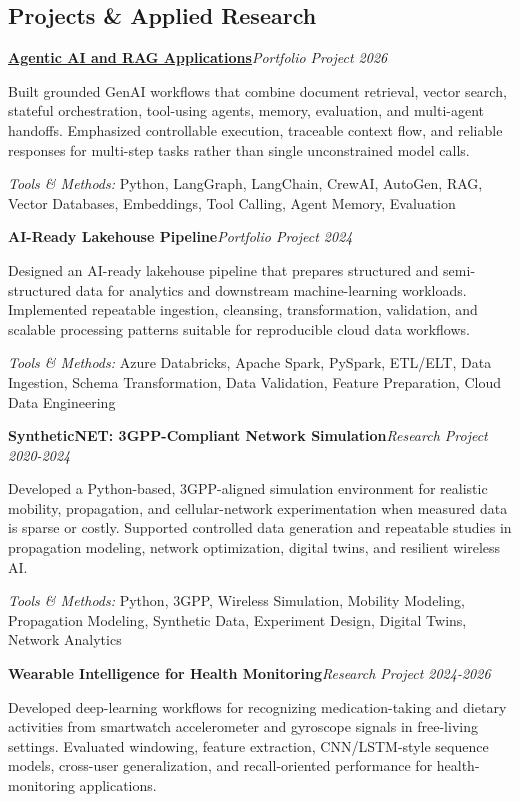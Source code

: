 \documentclass[9pt,letterpaper]{extarticle}
\newcommand{\entry}[2]{\Needspace{4\baselineskip}\textbf{#1}\hfill\textit{#2}\par}
\begin{document}
\subsection{Projects \& Applied Research}
\entry{\href{https://github.com/WaseemRaza844/agentic-ai-projects-by-was}{Agentic AI and RAG Applications}}{Portfolio Project \textbar{} 2026}
Built grounded GenAI workflows that combine document retrieval, vector search, stateful orchestration, tool-using agents, memory, evaluation, and multi-agent handoffs. Emphasized controllable execution, traceable context flow, and reliable responses for multi-step tasks rather than single unconstrained model calls.\par
{\small\textit{Tools \& Methods:} Python, LangGraph, LangChain, CrewAI, AutoGen, RAG, Vector Databases, Embeddings, Tool Calling, Agent Memory, Evaluation\par}
\vspace{1pt}
\entry{AI-Ready Lakehouse Pipeline}{Portfolio Project \textbar{} 2024}
Designed an AI-ready lakehouse pipeline that prepares structured and semi-structured data for analytics and downstream machine-learning workloads. Implemented repeatable ingestion, cleansing, transformation, validation, and scalable processing patterns suitable for reproducible cloud data workflows.\par
{\small\textit{Tools \& Methods:} Azure Databricks, Apache Spark, PySpark, ETL/ELT, Data Ingestion, Schema Transformation, Data Validation, Feature Preparation, Cloud Data Engineering\par}
\vspace{1pt}
\entry{SyntheticNET: 3GPP-Compliant Network Simulation}{Research Project \textbar{} 2020-2024}
Developed a Python-based, 3GPP-aligned simulation environment for realistic mobility, propagation, and cellular-network experimentation when measured data is sparse or costly. Supported controlled data generation and repeatable studies in propagation modeling, network optimization, digital twins, and resilient wireless AI.\par
{\small\textit{Tools \& Methods:} Python, 3GPP, Wireless Simulation, Mobility Modeling, Propagation Modeling, Synthetic Data, Experiment Design, Digital Twins, Network Analytics\par}
\vspace{1pt}
\entry{Wearable Intelligence for Health Monitoring}{Research Project \textbar{} 2024-2026}
Developed deep-learning workflows for recognizing medication-taking and dietary activities from smartwatch accelerometer and gyroscope signals in free-living settings. Evaluated windowing, feature extraction, CNN/LSTM-style sequence models, cross-user generalization, and recall-oriented performance for health-monitoring applications.\par
\end{document}
